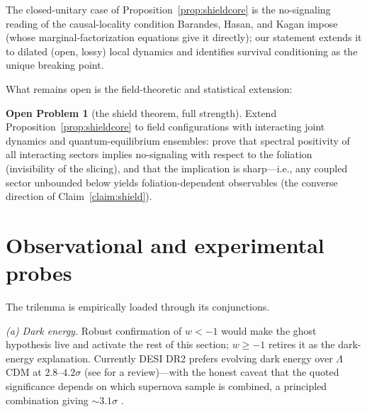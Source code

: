 \documentclass[11pt]{article}
\theoremstyle{definition}
\newtheorem{openproblem}[theorem]{Open Problem}
\theoremstyle{remark}
\begin{document}
The closed-unitary case of Proposition~\ref{prop:shieldcore} is the
no-signaling reading of the causal-locality condition Barandes, Hasan,
and Kagan impose \cite{BHK2025} (whose marginal-factorization equations
give it directly); our statement extends it to dilated (open, lossy) local dynamics
and identifies survival conditioning as the unique breaking point.

What remains open is the field-theoretic and statistical extension:

\begin{openproblem}[the shield theorem, full strength]
\label{op:shield}
Extend Proposition~\ref{prop:shieldcore} to field configurations
with interacting joint dynamics and quantum-equilibrium ensembles:
prove that spectral positivity of all interacting sectors implies
no-signaling with respect to the foliation (invisibility of the
slicing), and that the implication is sharp---i.e., any coupled
sector unbounded below yields foliation-dependent observables (the
converse direction of Claim~\ref{claim:shield}).
\end{openproblem}

\section{Observational and experimental probes}
\label{sec:tests}

The trilemma is empirically loaded through its conjunctions.

\emph{(a) Dark energy.} Robust confirmation of $w<-1$ would make
the ghost hypothesis live and activate the rest of this section;
$w\ge-1$ retires it as the dark-energy explanation. Currently DESI DR2 prefers evolving dark
energy over $\Lambda$CDM at $2.8$--$4.2\sigma$ \cite{DESIDR2} (see
\cite{DESIreview} for a review)---with the honest caveat that the
quoted significance depends on which supernova sample is combined, a
principled combination giving ${\sim}3.1\sigma$ \cite{DESIskeptic}.
\end{document}
